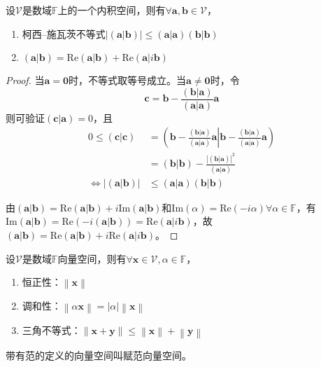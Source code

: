 \documentclass[main.tex]{subfiles}
\begin{document}
\begin{theorem}
设$\mathcal{V}$是数域$\mathbb{F}$上的一个内积空间，则有$\forall\mathbf{a},\mathbf{b}\in\mathcal{V}$，
\begin{enumerate}
    \item 柯西--施瓦茨不等式$\left|\left(\mathbf{a}|\mathbf{b}\right)\right|\leq\left(\mathbf{a}|\mathbf{a}\right)\left(\mathbf{b}|\mathbf{b}\right)$
    \item $\left(\mathbf{a}|\mathbf{b}\right)=\mathrm{Re}\left(\mathbf{a}|\mathbf{b}\right)+\mathrm{Re}\left(\mathbf{a}|i\mathbf{b}\right)$
\end{enumerate}
\end{theorem}
\begin{proof}
当$\mathbf{a}=\mathbf{0}$时，不等式取等号成立。当$\mathbf{a}\neq\mathbf{0}$时，令
\[
\mathbf{c}=\mathbf{b}-\frac{\left(\mathbf{b}|\mathbf{a}\right)}{\left(\mathbf{a}|\mathbf{a}\right)}\mathbf{a}
\]
则可验证$\left(\mathbf{c}|\mathbf{a}\right)=0$，且
\begin{align*}
0\leq\left(\mathbf{c}|\mathbf{c}\right)&=\left(\mathbf{b}-\frac{\left(\mathbf{b}|\mathbf{a}\right)}{\left(\mathbf{a}|\mathbf{a}\right)}\mathbf{a}\right|\left.\mathbf{b}-\frac{\left(\mathbf{b}|\mathbf{a}\right)}{\left(\mathbf{a}|\mathbf{a}\right)}\mathbf{a}\right)\\
&=\left(\mathbf{b}|\mathbf{b}\right)-\frac{\left|\left(\mathbf{b}|\mathbf{a}\right)\right|^2}{\left(\mathbf{a}|\mathbf{a}\right)}\\
\Leftrightarrow \left|\left(\mathbf{a}|\mathbf{b}\right)\right|&\leq\left(\mathbf{a}|\mathbf{a}\right)\left(\mathbf{b}|\mathbf{b}\right)
\end{align*}

由$\left(\mathbf{a}|\mathbf{b}\right)=\mathrm{Re}\left(\mathbf{a}|\mathbf{b}\right)+i\mathrm{Im}\left(\mathbf{a}|\mathbf{b}\right)$和$\mathrm{Im}\left(\alpha\right)=\mathrm{Re}\left(-i\alpha\right)\forall\alpha\in\mathbb{F}$，有$\mathrm{Im}\left(\mathbf{a}|\mathbf{b}\right)=\mathrm{Re}\left(-i\left(\mathbf{a}|\mathbf{b}\right)\right)=\mathrm{Re}\left(\mathbf{a}|i\mathbf{b}\right)$，故$\left(\mathbf{a}|\mathbf{b}\right)=\mathrm{Re}\left(\mathbf{a}|\mathbf{b}\right)+i\mathrm{Re}\left(\mathbf{a}|i\mathbf{b}\right)$。
\end{proof}

\begin{definition}[向量的范]\label{def:I.3.3}
设$\mathcal{V}$是数域$\mathbb{F}$向量空间，则有$\forall\mathbf{x}\in\mathcal{V},\alpha\in\mathbb{F}$，
\begin{enumerate}
    \item 恒正性：$\left\|\mathbf{x}\right\|$
    \item 调和性：$\left\|\alpha\mathbf{x}\right\|=\left|\alpha\right|\left\|\mathbf{x}\right\|$
    \item 三角不等式：$\left\|\mathbf{x}+\mathbf{y}\right\|\leq\left\|\mathbf{x}\right\|+\left\|\mathbf{y}\right\|$
\end{enumerate}
带有范的定义的向量空间叫赋范向量空间。
\end{definition}
\end{document}
